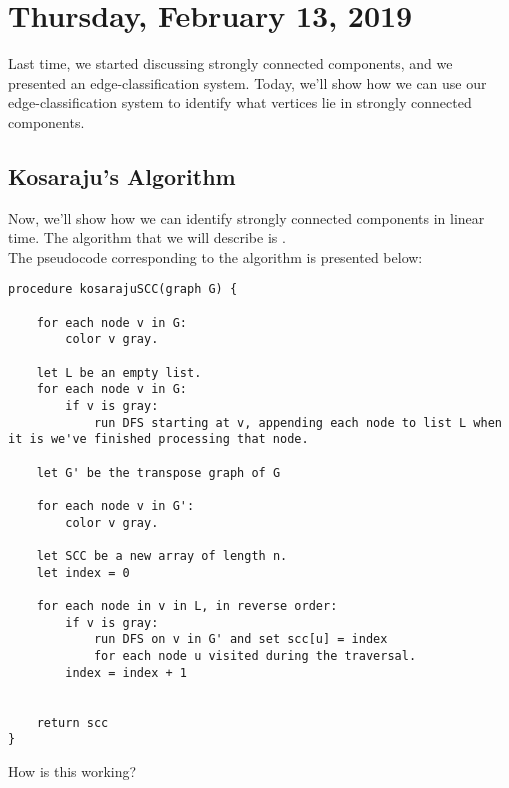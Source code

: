 \newpage

\section{Thursday, February 13, 2019}

Last time, we started discussing strongly connected components, and we presented an edge-classification system. Today, we'll show how we can use our edge-classification system to identify what vertices lie in strongly connected components.


\subsection{Kosaraju's Algorithm}

Now, we'll show how we can identify strongly connected components in linear time. The algorithm that we will describe is . \\

The pseudocode corresponding to the algorithm is presented below: 


\begin{lstlisting}
procedure kosarajuSCC(graph G) {
    
    for each node v in G: 
        color v gray.
        
    let L be an empty list.
    for each node v in G:
        if v is gray:
            run DFS starting at v, appending each node to list L when it is we've finished processing that node.
    
    let G' be the transpose graph of G
    
    for each node v in G':
        color v gray.
        
    let SCC be a new array of length n.
    let index = 0
    
    for each node in v in L, in reverse order:
        if v is gray:
            run DFS on v in G' and set scc[u] = index
            for each node u visited during the traversal.
        index = index + 1
    
    
    return scc
}
\end{lstlisting}


How is this working?

